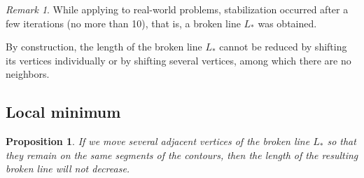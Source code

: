 \documentclass[]{interact}
\theoremstyle{plain}%
\newtheorem{proposition}[theorem]{Proposition}
\theoremstyle{definition}
\theoremstyle{remark}
\newtheorem{remark}{Remark}
\begin{document}
\begin{remark}
While applying to real-world problems,
stabilization occurred after a few iterations
(no more than 10),
that is, a broken line
$L_*$ was obtained.
\end{remark}

By construction,
the length of the broken line
$L_*$
cannot be reduced by shifting its vertices individually
or by shifting several vertices,
among which there are no neighbors.

\subsection{Local minimum}

\begin{proposition}
If we move several adjacent vertices of the broken line
$L_*$
so that they remain on the same segments of the contours,
then the length of the resulting broken line will not decrease.
\end{proposition}
\end{document}
